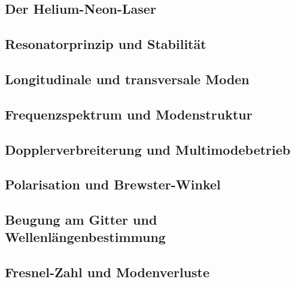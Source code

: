 \subsection{Der Helium-Neon-Laser}
\subsection{Resonatorprinzip und Stabilität}
\subsection{Longitudinale und transversale Moden}
\subsection{Frequenzspektrum und Modenstruktur}
\subsection{Dopplerverbreiterung und Multimodebetrieb}
\subsection{Polarisation und Brewster-Winkel}
\subsection{Beugung am Gitter und Wellenlängenbestimmung}
\subsection{Fresnel-Zahl und Modenverluste}

\cite{anleitungV61}
\cite{laserspektroskopie}
\cite{laser}
\cite{photonics}


